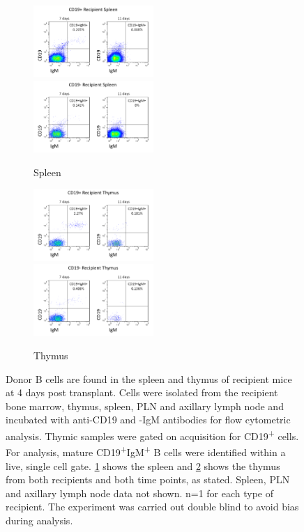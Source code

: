 \begin{figure}
	\begin{subfigure}{\textwidth}
	\caption{Spleen}
	\includegraphics[width=0.5\textwidth]{Figures/CD19posrecipspleen.png}
	\includegraphics[width=0.5\textwidth]{Figures/CD19negrecipspleen.png}
	\label{subfig:transferspleen}
	\end{subfigure}
	\begin{subfigure}{\textwidth}
	\caption{Thymus}
	\includegraphics[width=0.5\textwidth]{Figures/CD19posrecipthy.png}
	\includegraphics[width=0.5\textwidth]{Figures/CD19negrecipthy.png}
	\label{subfig:transferthymus}
	\end{subfigure}
\caption[Donor B cells are found in the spleen and thymus of recipient mice at 4 days post transplant]{Donor B cells are found in the spleen and thymus of recipient mice at 4 days post transplant.
Cells were isolated from the recipient bone marrow, thymus, spleen, PLN and axillary lymph node and incubated with anti-CD19 and -IgM antibodies for flow cytometric analysis.
Thymic samples were gated on acquisition for CD19\textsuperscript{+} cells.
For analysis, mature CD19\textsuperscript{+}IgM\textsuperscript{+} B cells were identified within a live, single cell gate.
\ref{subfig:transferspleen} shows the spleen and \ref{subfig:transferthymus} shows the thymus from both recipients and both time points, as stated. Spleen, PLN and axillary lymph node data not shown. n=1 for each type of recipient.
The experiment was carried out double blind to avoid bias during analysis.}
\label{fig:Transfer}
\end{figure}

